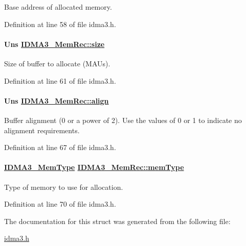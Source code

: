 Base address of allocated memory. 

Definition at line 58 of file idma3.h.\hypertarget{struct_i_d_m_a3___mem_rec_667c10232578b390f66e698d796b4d2d}{
\paragraph[size]{\setlength{\rightskip}{0pt plus 5cm}Uns \hyperlink{struct_i_d_m_a3___mem_rec_667c10232578b390f66e698d796b4d2d}{IDMA3\_\-Mem\-Rec::size}}\hfill}
\label{struct_i_d_m_a3___mem_rec_667c10232578b390f66e698d796b4d2d}


Size of buffer to allocate (MAUs). 

Definition at line 61 of file idma3.h.\hypertarget{struct_i_d_m_a3___mem_rec_18a74cc1005f251748f198ff09f8e76f}{
\paragraph[align]{\setlength{\rightskip}{0pt plus 5cm}Uns \hyperlink{struct_i_d_m_a3___mem_rec_18a74cc1005f251748f198ff09f8e76f}{IDMA3\_\-Mem\-Rec::align}}\hfill}
\label{struct_i_d_m_a3___mem_rec_18a74cc1005f251748f198ff09f8e76f}


Buffer alignment (0 or a power of 2). Use the values of 0 or 1 to indicate no alignment requirements. 

Definition at line 67 of file idma3.h.\hypertarget{struct_i_d_m_a3___mem_rec_6036233a20bd80fe13a6921db305ee9d}{
\paragraph[memType]{\setlength{\rightskip}{0pt plus 5cm}\hyperlink{group___d_s_p_i_d_m_a3_gbe0577eecc288b36121382daa765093a}{IDMA3\_\-Mem\-Type} \hyperlink{struct_i_d_m_a3___mem_rec_6036233a20bd80fe13a6921db305ee9d}{IDMA3\_\-Mem\-Rec::mem\-Type}}\hfill}
\label{struct_i_d_m_a3___mem_rec_6036233a20bd80fe13a6921db305ee9d}


Type of memory to use for allocation. 

Definition at line 70 of file idma3.h.

The documentation for this struct was generated from the following file:\begin{CompactItemize}
\item 
\hyperlink{idma3_8h}{idma3.h}\end{CompactItemize}
